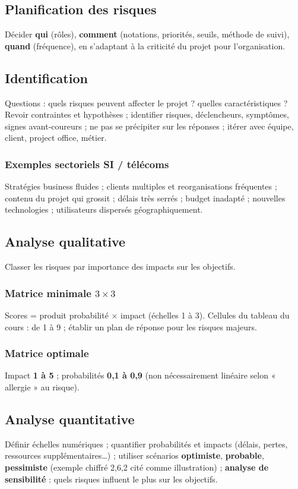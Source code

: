 \documentclass[11pt,a4paper]{article}
\begin{document}
\subsection{Planification des risques}
Décider \textbf{qui} (rôles), \textbf{comment} (notations, priorités, seuils, méthode de suivi), \textbf{quand} (fréquence), en s'adaptant à la criticité du projet pour l'organisation.

\subsection{Identification}
Questions : quels risques peuvent affecter le projet ? quelles caractéristiques ? Revoir contraintes et hypothèses ; identifier risques, déclencheurs, symptômes, signes avant-coureurs ; ne pas se précipiter sur les réponses ; itérer avec équipe, client, project office, métier.

\subsubsection{Exemples sectoriels SI / télécoms}
Stratégies business fluides ; clients multiples et reorganisations fréquentes ; contenu du projet qui grossit ; délais très serrés ; budget inadapté ; nouvelles technologies ; utilisateurs dispersés géographiquement.

\subsection{Analyse qualitative}
Classer les risques par importance des impacts sur les objectifs.

\subsubsection{Matrice minimale $3\times 3$}
Scores = produit probabilité $\times$ impact (échelles 1 à 3). Cellules du tableau du cours : de 1 à 9 ; établir un plan de réponse pour les risques majeurs.

\subsubsection{Matrice optimale}
Impact \textbf{1 à 5} ; probabilités \textbf{0{,}1 à 0{,}9} (non nécessairement linéaire selon « allergie » au risque).

\subsection{Analyse quantitative}
Définir échelles numériques ; quantifier probabilités et impacts (délais, pertes, ressources supplémentaires\ldots) ; utiliser scénarios \textbf{optimiste}, \textbf{probable}, \textbf{pessimiste} (exemple chiffré 2{,}6{,}2 cité comme illustration) ; \textbf{analyse de sensibilité} : quels risques influent le plus sur les objectifs.
\end{document}

